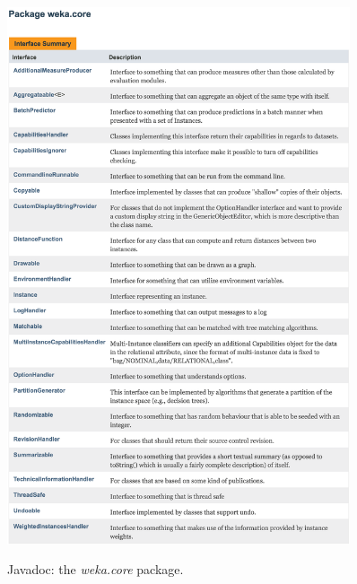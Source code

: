 \begin{figure}[!thp]
\centering
\includegraphics[width=0.9\textwidth]{images/B5_1b1.png}
\label{subfig:javadoc_b_0}
\caption{Javadoc: the \textit{weka.core} package.}
\end{figure}


